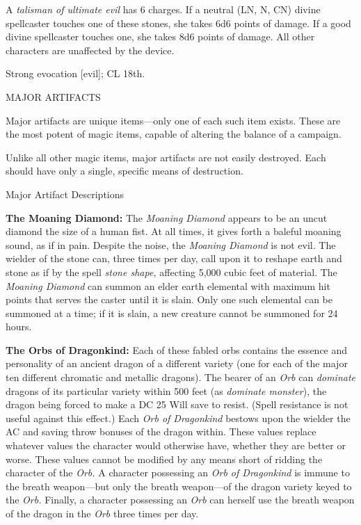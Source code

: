A \textit{talisman of ultimate evil }has 6 charges. If a neutral (LN, N, CN) divine 
spellcaster touches one of these stones, she takes 6d6 points of damage. If a good 
divine spellcaster touches one, she takes 8d6 points of damage. All other characters 
are unaffected by the device. 

Strong evocation [evil]; CL 18th.

\vspace{12pt}
MAJOR ARTIFACTS

Major artifacts are unique items---only one of each such item exists. These are 
the most potent of magic items, capable of altering the balance of a campaign.

Unlike all other magic items, major artifacts are not easily destroyed. Each should 
have only a single, specific means of destruction.

\vspace{12pt}
Major Artifact Descriptions

\vspace{12pt}
\textbf{The Moaning Diamond:} The \textit{Moaning Diamond }appears to be an uncut 
diamond the size of a human fist. At all times, it gives forth a baleful moaning 
sound, as if in pain. Despite the noise, the \textit{Moaning Diamond }is not evil. 
The wielder of the stone can, three times per day, call upon it to reshape earth 
and stone as if by the spell \textit{stone shape, }affecting 5,000 cubic feet of 
material. The \textit{Moaning Diamond }can summon an elder earth elemental with 
maximum hit points that serves the caster until it is slain. Only one such elemental 
can be summoned at a time; if it is slain, a new creature cannot be summoned for 
24 hours. 

\vspace{12pt}
\textbf{The Orbs of Dragonkind:} Each of these fabled orbs contains the essence 
and personality of an ancient dragon of a different variety (one for each of the 
major ten different chromatic and metallic dragons). The bearer of an \textit{Orb 
}can \textit{dominate }dragons of its particular variety within 500 feet (as \textit{dominate 
monster}), the dragon being forced to make a DC 25 Will save to resist. (Spell 
resistance is not useful against this effect.) Each \textit{Orb of Dragonkind }bestows 
upon the wielder the AC and saving throw bonuses of the dragon within. These values 
replace whatever values the character would otherwise have, whether they are better 
or worse. These values cannot be modified by any means short of ridding the character 
of the \textit{Orb. }A character possessing an \textit{Orb of Dragonkind }is immune 
to the breath weapon---but only the breath weapon---of the dragon variety keyed 
to the \textit{Orb. }Finally, a character possessing an \textit{Orb }can herself 
use the breath weapon of the dragon in the \textit{Orb }three times per day.

